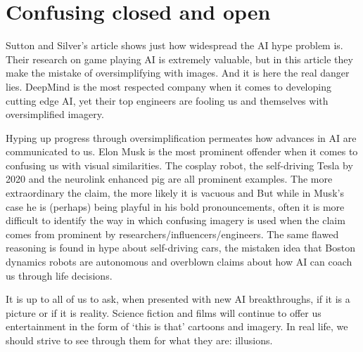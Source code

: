 



\section{Confusing closed and open}

Sutton and Silver’s article shows just how widespread the AI hype problem is. Their research on game playing AI is extremely valuable, but in this article they make the mistake of oversimplifying with images. And it is here the real danger lies. DeepMind is the most respected company when it comes to developing cutting edge AI, yet their top engineers are fooling us and themselves with oversimplified imagery.  

Hyping up progress through oversimplification permeates how advances in AI are communicated to us. Elon Musk is the most prominent offender when it comes to confusing us with visual similarities. The cosplay robot, the self-driving Tesla by 2020 and the neurolink enhanced pig are all prominent examples. The more extraordinary the claim, the more likely it is vacuous and But while in Musk’s case he is (perhaps) being playful in his bold pronouncements, often it is more difficult to identify the way in which confusing imagery is used when the claim comes from prominent by researchers/influencers/engineers. The same flawed reasoning is found in hype about self-driving cars, the mistaken idea that Boston dynamics robots are autonomous and overblown claims about how AI can coach us through life decisions. 

It is up to all of us to ask, when presented with new AI breakthroughs, if it is a picture or if it is reality. Science fiction and films will continue to offer us entertainment in the form of ‘this is that’ cartoons and imagery. In real life, we should strive to see through them for what they are: illusions. 


